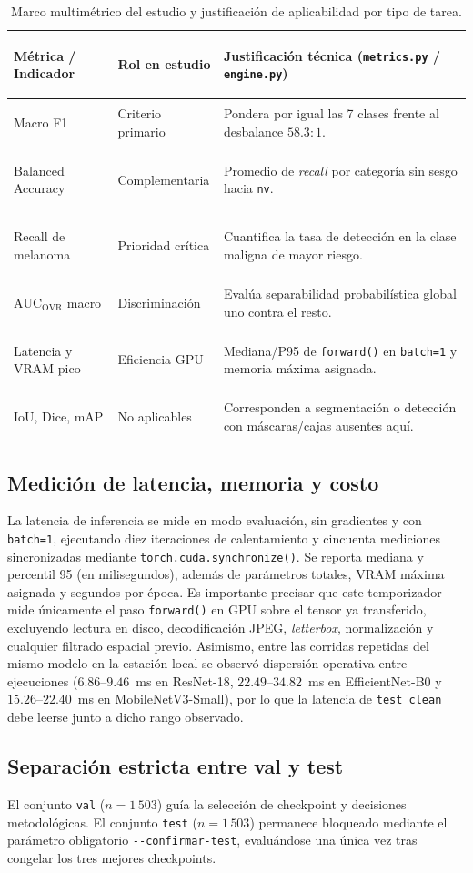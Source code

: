 \begin{table}[htbp]\centering\small
\caption{Marco multimétrico del estudio y justificación de aplicabilidad por tipo de tarea.}
\begin{tabularx}{\textwidth}{@{}>{\bfseries\raggedright\arraybackslash}p{3.9cm}>{\raggedright\arraybackslash}p{2.7cm}>{\raggedright\arraybackslash}X@{}}
\toprule
\textbf{Métrica / Indicador} & \textbf{Rol en estudio} & \textbf{Justificación técnica (\texttt{metrics.py} / \texttt{engine.py})} \\ \midrule
Macro F1 & Criterio primario & Pondera por igual las 7 clases frente al desbalance $58.3:1$. \\
Balanced Accuracy & Complementaria & Promedio de \textit{recall} por categoría sin sesgo hacia \texttt{nv}. \\
Recall de melanoma & Prioridad crítica & Cuantifica la tasa de detección en la clase maligna de mayor riesgo. \\
$\mathrm{AUC}_{\mathrm{OVR}}$ macro & Discriminación & Evalúa separabilidad probabilística global uno contra el resto. \\
Latencia y VRAM pico & Eficiencia GPU & Mediana/P95 de \texttt{forward()} en \texttt{batch=1} y memoria máxima asignada. \\
IoU, Dice, mAP & No aplicables & Corresponden a segmentación o detección con máscaras/cajas ausentes aquí. \\
\bottomrule
\end{tabularx}
\end{table}

\subsection{Medición de latencia, memoria y costo}
La latencia de inferencia se mide en modo evaluación, sin gradientes y con \texttt{batch=1}, ejecutando diez iteraciones de calentamiento y cincuenta mediciones sincronizadas mediante \texttt{torch.cuda.synchronize()}. Se reporta mediana y percentil 95 (en milisegundos), además de parámetros totales, VRAM máxima asignada y segundos por época. Es importante precisar que este temporizador mide únicamente el paso \texttt{forward()} en GPU sobre el tensor ya transferido, excluyendo lectura en disco, decodificación JPEG, \textit{letterbox}, normalización y cualquier filtrado espacial previo. Asimismo, entre las corridas repetidas del mismo modelo en la estación local se observó dispersión operativa entre ejecuciones ($6.86$--$9.46$~ms en ResNet-18, $22.49$--$34.82$~ms en EfficientNet-B0 y $15.26$--$22.40$~ms en MobileNetV3-Small), por lo que la latencia de \texttt{test\_clean} debe leerse junto a dicho rango observado.

\subsection{Separación estricta entre val y test}
El conjunto \texttt{val} ($n=1\,503$) guía la selección de checkpoint y decisiones metodológicas. El conjunto \texttt{test} ($n=1\,503$) permanece bloqueado mediante el parámetro obligatorio \texttt{-{}-confirmar-test}, evaluándose una única vez tras congelar los tres mejores checkpoints.
